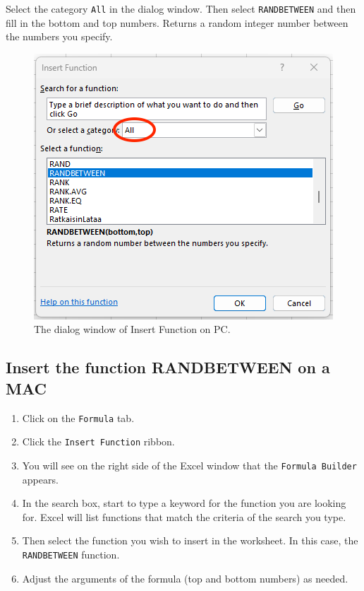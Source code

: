 \documentclass[
  12pt,
  letterpaper,
]{book}
\providecommand{\tightlist}{%
  \setlength{\itemsep}{0pt}\setlength{\parskip}{0pt}}
\begin{document}
Select the category \texttt{All} in the dialog window. Then select \texttt{RANDBETWEEN} and then fill in the bottom and top numbers. Returns a random integer number between the numbers you specify.

\begin{figure}

{\centering \includegraphics[width=0.6\linewidth]{images/randbetween-pc} 

}

\caption{The dialog window of Insert Function on PC.}\label{fig:irandbetween-pc}
\end{figure}

\hypertarget{insert-the-function-randbetween-on-a-mac}{%
\subsection{Insert the function RANDBETWEEN on a MAC}\label{insert-the-function-randbetween-on-a-mac}}

\begin{enumerate}
\def\labelenumi{\arabic{enumi}.}
\tightlist
\item
  Click on the \texttt{Formula} tab.
\item
  Click the \texttt{Insert\ Function} ribbon.
\item
  You will see on the right side of the Excel window that the \texttt{Formula\ Builder} appears.
\item
  In the search box, start to type a keyword for the function you are looking for. Excel will list functions that match the criteria of the search you type.
\item
  Then select the function you wish to insert in the worksheet. In this case, the \texttt{RANDBETWEEN} function.
\item
  Adjust the arguments of the formula (top and bottom numbers) as needed.
\end{enumerate}
\end{document}
